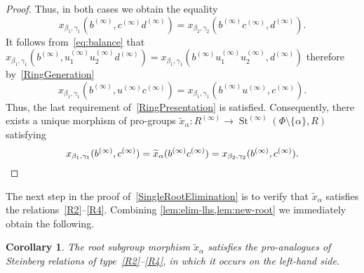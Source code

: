 \documentclass[oneside, 11pt]{amsart}
\numberwithin{equation}{section}
\newtheorem{corollary}[lemma]{Corollary}
\theoremstyle{definition}
\theoremstyle{remark}
\DeclareMathOperator\St{St}
\begin{document}
\begin{proof}
 Thus, in both cases we obtain the equality
 \begin{equation}\label{eq:balance}
 x_{\beta_1, \gamma_1}(b^{(\infty)}, c^{(\infty)} d^{(\infty)}) = x_{\beta_2, \gamma_2}(b^{(\infty)} c^{(\infty)}, d^{(\infty)}).
 \end{equation}
 It follows from~\eqref{eq:balance} that $x_{\beta_1,\gamma_1}(b^{(\infty)}, u_1^{(\infty)}u_2^{(\infty)}d^{(\infty)}) = x_{\beta_1,\gamma_1}(b^{(\infty)}u_1^{(\infty)}u_2^{(\infty)},d^{(\infty)})$ therefore by~\cref{RingGeneration}
 \[x_{\beta_1, \gamma_1}(b^{(\infty)}, u^{(\infty)} c^{(\infty)}) = x_{\beta_1, \gamma_1}(b^{(\infty)} u^{(\infty)}, c^{(\infty)}).\]
 Thus, the last requirement of~\cref{RingPresentation} is satisfied. Consequently, there exists a unique morphism of pro-groups \(\widetilde x_\alpha \colon R^{(\infty)} \to \St^{(\infty)}(\Phi \setminus \{\alpha\}, R)\) satisfying
 \begin{equation} \label{eq:new-root} x_{\beta_1, \gamma_1}(b^{(\infty)}, c^{(\infty)}) = \widetilde x_\alpha(b^{(\infty)} c^{(\infty)}) = x_{\beta_2, \gamma_2}(b^{(\infty)}, c^{(\infty)}). \qedhere\end{equation}
\end{proof}

The next step in the proof of~\cref{SingleRootElimination} is to verify that $\widetilde{x}_\alpha$ satisfies the relations~\eqref{R2}--\eqref{R4}.
Combining \cref{lem:elim-lhs,lem:new-root} we immediately obtain the following.
\begin{corollary} \label{cor:elim-lhs}
 The root subgroup morphism $\widetilde{x}_\alpha$ satisfies the pro-analogues of Steinberg relations of type~\eqref{R2}--\eqref{R4}, in which it occurs on the left-hand side.
\end{corollary}
\end{document}
